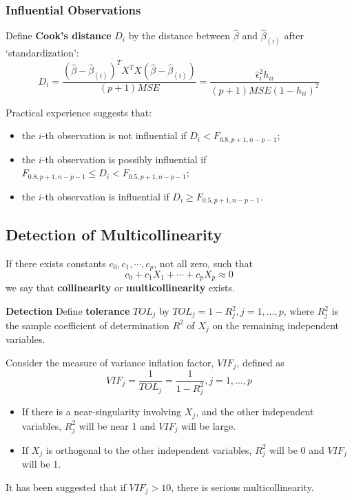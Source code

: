 \documentclass[11pt,a4paper]{article}
\begin{document}
\subsubsection{Influential Observations}
Define \textbf{Cook's distance} $D_i$ by the distance between $\hat{\beta}$ and $\hat{\beta}_{(i)}$ after `standardization':
\[
D_i = \frac{(\hat{\beta} - \hat{\beta}_{(i)})^T X^TX (\hat{\beta} - \hat{\beta}_{(i)})}{(p+1) MSE} = \frac{\hat{\epsilon}_i^2 h_{ii}}{(p+1) MSE (1 - h_{ii})^2}
\]

Practical experience suggests that:
\begin{itemize}
    \item the $i$-th observation is not influential if $D_i < F_{0.8, p+1, n-p-1}$;
    \item the $i$-th observation is possibly influential if $F_{0.8, p+1, n-p-1} \leq D_i < F_{0.5, p+1, n-p-1}$;
    \item the $i$-th observation is influential if $D_i \geq F_{0.5, p+1, n-p-1}$.
\end{itemize}

\subsection{Detection of Multicollinearity}
If there exists constants $c_0, c_1, \cdots, c_p$, not all zero, such that
\[
c_0 + c_1 X_1 + \cdots + c_p X_p \approx 0
\]
we say that \textbf{collinearity} or \textbf{multicollinearity} exists. \par
\textbf{Detection}
Define \textbf{tolerance} $TOL_j$ by $TOL_j = 1 - R_j^2, j = 1, \dots, p$, where $R_j^2$ is the sample coefficient of determination $R^2$ of $X_j$ on the remaining independent variables. \par
Consider the measure of variance inflation factor, $VIF_j$, defined as
\[
VIF_j = \frac{1}{TOL_j} = \frac{1}{1 - R_j^2}, j = 1, \dots, p
\]

\begin{itemize}
    \item If there is a near-singularity involving $X_j$, and the other independent variables, $R_j^2$  will be near 1 and $VIF_j$ will be large.
    \item If $X_j$ is orthogonal to the other independent variables, $R_j^2$ will be 0 and $VIF_j$ will be 1.
\end{itemize}

It has been suggested that if $VIF_j > 10$, there is serious multicollinearity.
\end{document}
